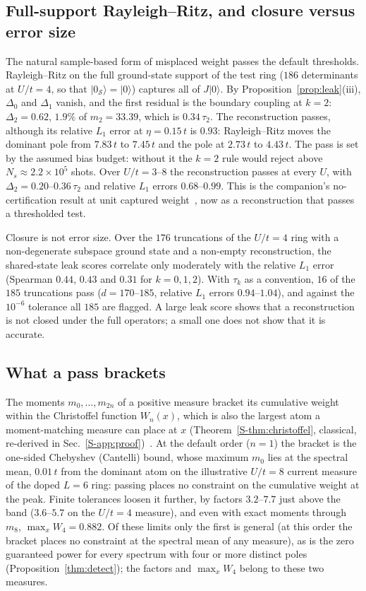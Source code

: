 \documentclass[aps,prb,reprint,onecolumn,12pt,superscriptaddress,longbibliography,floatfix]{revtex4-2}
\begin{document}
\subsection{Full-support Rayleigh--Ritz, and closure versus error size}
\label{sec:rr}
The natural sample-based form of misplaced weight passes the default thresholds. Rayleigh--Ritz on the full ground-state support of the test ring ($186$ determinants at $U/t=4$, so that $|0_\mathcal S\rangle=|0\rangle$) captures all of $J|0\rangle$. By Proposition~\ref{prop:leak}(iii), $\Delta_0$ and $\Delta_1$ vanish, and the first residual is the boundary coupling at $k=2$: $\Delta_2=0.62$, $1.9\%$ of ${m_2=33.39}$, which is $0.34\,\tau_2$. The reconstruction passes, although its relative $L_1$ error at $\eta=0.15\,t$ is $0.93$: Rayleigh--Ritz moves the dominant pole from $7.83\,t$ to $7.45\,t$ and the pole at $2.73\,t$ to $4.43\,t$. The pass is set by the assumed bias budget: without it the $k=2$ rule would reject above $N_s\approx2.2\times10^5$ shots. Over $U/t=3$--$8$ the reconstruction passes at every $U$, with $\Delta_2=0.20$--$0.36\,\tau_2$ and relative $L_1$ errors $0.68$--$0.99$. This is the companion's no-certification result at unit captured weight~\cite{SQDspec2608}, now as a reconstruction that passes a thresholded test.

Closure is not error size. Over the $176$ truncations of the $U/t=4$ ring with a non-degenerate subspace ground state and a non-empty reconstruction, the shared-state leak scores correlate only moderately with the relative $L_1$ error (Spearman $0.44$, $0.43$ and $0.31$ for $k=0,1,2$). With $\tau_k$ as a convention, $16$ of the $185$ truncations pass ($d=170$--$185$, relative $L_1$ errors $0.94$--$1.04$), and against the $10^{-6}$ tolerance all $185$ are flagged. A large leak score shows that a reconstruction is not closed under the full operators; a small one does not show that it is accurate.

\subsection{What a pass brackets}
\label{sec:bracket}
The moments $m_0,\dots,m_{2n}$ of a positive measure bracket its cumulative weight within the Christoffel function $W_n(x)$, which is also the largest atom a moment-matching measure can place at $x$ (Theorem~\ref{S-thm:christoffel}, classical, re-derived in Sec.~\ref{S-app:proof})~\cite{GM2010,ShohatTamarkin1943,Akhiezer1965,KarlinStudden1966}. At the default order ($n=1$) the bracket is the one-sided Chebyshev (Cantelli) bound, whose maximum $m_0$ lies at the spectral mean, $0.01\,t$ from the dominant atom on the illustrative $U/t=8$ current measure of the doped $L=6$ ring: passing places no constraint on the cumulative weight at the peak. Finite tolerances loosen it further, by factors $3.2$--$7.7$ just above the band ($3.6$--$5.7$ on the $U/t=4$ measure), and even with exact moments through $m_8$, $\max_xW_4=0.882$. Of these limits only the first is general (at this order the bracket places no constraint at the spectral mean of any measure), as is the zero guaranteed power for every spectrum with four or more distinct poles (Proposition~\ref{thm:detect}); the factors and $\max_xW_4$ belong to these two measures.
\end{document}
